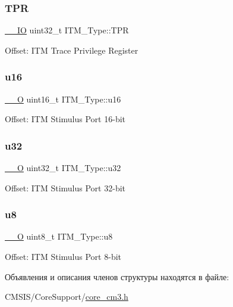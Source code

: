 \subsubsection{\texorpdfstring{TPR}{TPR}}
{\footnotesize\ttfamily \mbox{\hyperlink{group___c_m_s_i_s___c_m3__core__definitions_gaec43007d9998a0a0e01faede4133d6be}{\+\_\+\+\_\+\+IO}} uint32\+\_\+t I\+T\+M\+\_\+\+Type\+::\+T\+PR}

Offset\+: I\+TM Trace Privilege Register ~\newline
 \mbox{\label{struct_i_t_m___type_a12aa4eb4d9dcb589a5d953c836f4e8f4}} 
\subsubsection{\texorpdfstring{u16}{u16}}
{\footnotesize\ttfamily \mbox{\hyperlink{group___c_m_s_i_s___c_m3__core__definitions_ga7e25d9380f9ef903923964322e71f2f6}{\+\_\+\+\_\+O}} uint16\+\_\+t I\+T\+M\+\_\+\+Type\+::u16}

Offset\+: I\+TM Stimulus Port 16-\/bit ~\newline
 \mbox{\label{struct_i_t_m___type_a6882fa5af67ef5c5dfb433b3b68939df}} 
\subsubsection{\texorpdfstring{u32}{u32}}
{\footnotesize\ttfamily \mbox{\hyperlink{group___c_m_s_i_s___c_m3__core__definitions_ga7e25d9380f9ef903923964322e71f2f6}{\+\_\+\+\_\+O}} uint32\+\_\+t I\+T\+M\+\_\+\+Type\+::u32}

Offset\+: I\+TM Stimulus Port 32-\/bit ~\newline
 \mbox{\label{struct_i_t_m___type_abea77b06775d325e5f6f46203f582433}} 
\subsubsection{\texorpdfstring{u8}{u8}}
{\footnotesize\ttfamily \mbox{\hyperlink{group___c_m_s_i_s___c_m3__core__definitions_ga7e25d9380f9ef903923964322e71f2f6}{\+\_\+\+\_\+O}} uint8\+\_\+t I\+T\+M\+\_\+\+Type\+::u8}

Offset\+: I\+TM Stimulus Port 8-\/bit ~\newline
 

Объявления и описания членов структуры находятся в файле\+:\begin{DoxyCompactItemize}
\item 
C\+M\+S\+I\+S/\+Core\+Support/\mbox{\hyperlink{core__cm3_8h}{core\+\_\+cm3.\+h}}\end{DoxyCompactItemize}
